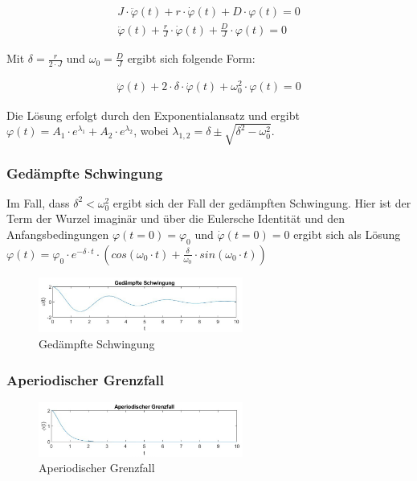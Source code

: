 \documentclass{article}
\begin{document}
\begin{gather} \label{eq:ged_schw_diff}
    J \cdot \ddot \varphi(t) + r \cdot \dot \varphi(t) + D \cdot \varphi(t) = 0 \\
    \ddot \varphi(t) + \frac{r}{J} \cdot \dot \varphi(t) + \frac{D}{J} \cdot \varphi(t) = 0
\end{gather}

\noindent Mit $\delta = \frac{r}{2 \cdot J}$ und $\omega_0 = \frac{D}{J}$ ergibt sich folgende Form:

\begin{gather} \label{eq:ged_schw_delta_omega}
    \ddot \varphi(t) + 2 \cdot \delta \cdot \dot \varphi(t) + \omega_0^2 \cdot \varphi(t) = 0
\end{gather}

Die Lösung erfolgt durch den Exponentialansatz und ergibt $\varphi(t) = A_1 \cdot e^{\lambda_1} + A_2 \cdot e^{\lambda_2}$, wobei
$\lambda_{1,2} = \delta \pm \sqrt{\delta^2 - \omega_0^2}$.

\subsubsection{Gedämpfte Schwingung}
Im Fall, dass $\delta^2 < \omega_0^2$ ergibt sich der Fall der gedämpften Schwingung. Hier ist der Term der Wurzel imaginär und
über die Eulersche Identität und den Anfangsbedingungen $\varphi(t = 0) = \varphi_0$ und $\dot \varphi(t = 0) = 0$
ergibt sich als Lösung $\varphi(t) = \varphi_0 \cdot e^{-\delta \cdot t} \cdot (cos(\omega_0 \cdot t) + \frac{\delta}{\omega_0} \cdot sin(\omega_0 \cdot t))$

\begin{figure}[H]
    \centering
    \includegraphics[width=0.6\textwidth]{bilder/schwingung_gedampft.png}
    \caption{Gedämpfte Schwingung}
    \label{fig:schw_ged}
\end{figure}

\subsubsection{Aperiodischer Grenzfall}

\begin{figure}[H]
    \centering
    \includegraphics[width=0.6\textwidth]{bilder/aperiodischer_grenzfall.png}
    \caption{Aperiodischer Grenzfall}
    \label{fig:aperiod}
\end{figure}
\end{document}

